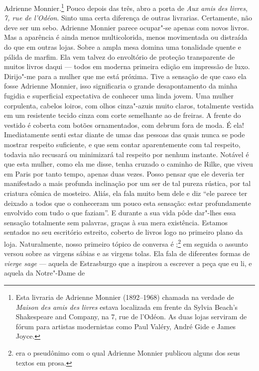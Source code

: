 Adrienne Monnier.\footnote{Esta livraria de
  Adrienne Monnier (1892--1968) chamada na verdade de \emph{Maison des
  amis des livres} estava localizada em frente da Sylvia Beach's
  Shakespeare and Company, na 7, rue de l'Odéon. As duas lojas serviram
  de fórum para artistas modernistas como Paul Valéry, André Gide e
  James Joyce. \versal{[N.~O.]}} Pouco depois das três, abro a porta de \emph{Aux amis
des livres}, \emph{7, rue de l'Odéon}. Sinto uma certa diferença de
outras livrarias. Certamente, não deve ser um sebo. Adrienne Monnier
parece ocupar"-se apenas com novos livros. Mas a aparência é ainda menos
multicolorida, menos movimentada ou distraída do que em outras lojas.
Sobre a ampla mesa domina uma tonalidade quente e pálida de marfim. Ela vem talvez do envoltório de proteção transparente de muitos livros daqui --- todos em
moderna primeira edição em impressão de luxo. Dirijo"-me para a mulher que me está próxima. Tive a sensação de que caso ela fosse Adrienne Monnier, isso significaria o grande desapontamento da minha fugidia e superficial expectativa de conhecer uma linda jovem. Uma mulher corpulenta, cabelos
loiros, com olhos cinza"-azuis muito claros, totalmente vestida em um
resistente tecido cinza com corte semelhante ao de freiras. A frente do
vestido é coberta com botões ornamentados, com debrum fora de moda. É
ela! Imediatamente senti estar diante de umas das pessoas das quais
nunca se pode mostrar respeito suficiente, e que sem contar
aparentemente com tal respeito, todavia não recusará ou minimizará tal
respeito por nenhum instante. Notável é que esta mulher, como ela me
disse, tenha cruzado o caminho de Rilke, que viveu em Paris por tanto
tempo, apenas duas vezes. Posso pensar que ele deveria ter manifestado a
mais profunda inclinação por um ser de tal pureza rústica, por tal
criatura cômica de mosteiro. Aliás, ela fala muito bem dele e diz ``ele
parece ter deixado a todos que o conheceram um pouco esta sensação:
estar profundamente envolvido com tudo o que faziam''. E durante a sua
vida pôde dar"-lhes essa sensação totalmente sem palavras, graças à sua
mera existência. Estamos sentados no seu escritório estreito, coberto de
livros logo no primeiro plano da loja. Naturalmente, nosso primeiro
tópico de conversa é ;\footnote{ era o pseudônimo com o
  qual Adrienne Monnier publicou alguns dos seus textos em prosa. \versal{[N.~O.]}} em
seguida o assunto versou sobre as virgens sábias e as virgens tolas. Ela
fala de diferentes formas de \emph{vierge sage} --- aquela de Estrasburgo
que a inspirou a escrever a peça que eu li, e aquela da Notre"-Dame de
